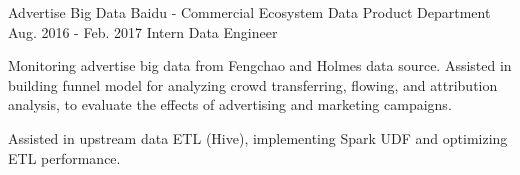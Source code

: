 \documentclass[11pt, a4paper, UTF8]{awesome-cv}
\begin{document}
\begin{cventries}
  \cventry
    {Advertise Big Data} %
    {Baidu - Commercial Ecosystem Data Product Department} %
    {Aug. 2016 - Feb. 2017} %
    {Intern Data Engineer} %
    {
      \begin{cvitems} %
        \item {Monitoring advertise big data from Fengchao and Holmes data source. Assisted in building funnel model for analyzing crowd transferring, flowing, and attribution analysis, to evaluate the effects of advertising and marketing campaigns.}
        \item {Assisted in upstream data ETL (Hive), implementing Spark UDF and optimizing ETL performance.}
      \end{cvitems}
    }
        
\end{cventries}
\end{document}
